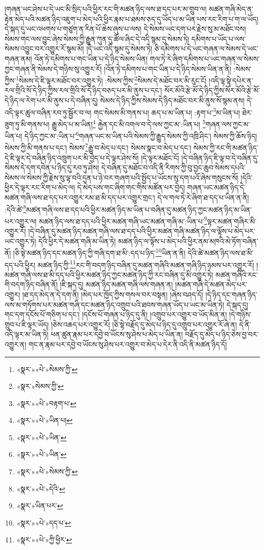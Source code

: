 །གཞན་ཡང་ཤེས་པ་དེ་ཡང་མི་སྲིད་པའི་ཕྱིར་རང་གི་མཚན་ཉིད་ལས་ཐ་དད་པར་མ་གྲུབ་ལ། མཚན་གཞི་མེད་ན་རྟེན་མེད་པའི་མཚན་ཉིད་འཇུག་པ་མེད་པའི་ཕྱིར་རྣམ་པ་ཐམས་ཅད་དུ་ཡོད་པ་མ་ཡིན་པས་རང་རིག་པ་ག་ལ་ཡོད། དེ་སྐད་དུ་ཡང་འཕགས་པ་གཙུག་ན་རིན་པོ་ཆེས་ཞུས་པ་ལས། དེ་སེམས་ཡང་དག་པར་རྗེས་སུ་མ་མཐོང་བས། སེམས་གང་ལས་བྱུང་ཞེས་སེམས་ཀྱི་རྒྱུན་ཀུན་དུ་ཚོལ་ཞིང་དེ་འདི་སྙམ་དུ་སེམས་ཏེ། དམིགས་པ་ཡོད་པ་ལས་སེམས་འབྱུང་བར་འགྱུར་རོ་སྙམ་མོ། །དེ་ཡང་འདི་སྙམ་དུ་སེམས་ཏེ། ཅི་དམིགས་པ་དེ་ཡང་གཞན་ལ་སེམས་དེ་ཡང་གཞན་ནམ། འོན་ཏེ་དམིགས་པ་གང་ཡིན་པ་དེ་ཉིད་སེམས་ཡིན། གལ་ཏེ་རེ་ཞིག་དམིགས་པ་ཡང་གཞན་ལ་སེམས་ཀྱང་གཞན་ནི་སེམས་དེ་གཉིས་སུ་འགྱུར་རོ། །འོན་ཏེ་དམིགས་པ་གང་ཡིན་པ་དེ་ཉིད་སེམས་ཡིན་ན་ནི། :སེམས་ཀྱིས་\footnote{«སྣར་»«པེ་»སེམས་ཀྱི་}སེམས་དེ་ཇི་ལྟར་མཐོང་བར་འགྱུར་ཏེ། :སེམས་ཀྱིས་\footnote{«སྣར་»སེམས་ཀྱི་}སེམས་དེ་མཐོང་བར་མི་རུང་ངོ། །འདི་ལྟ་སྟེ་དཔེར་ན་རལ་གྲིའི་སོ་དེ་ཉིད་ཀྱིས་རལ་གྲིའི་སོ་དེ་ཉིད་བཅད་པར་མི་ནུས་པ་དང་། སོར་མོའི་རྩེ་མོ་དེ་ཉིད་ཀྱིས་སོར་མོའི་རྩེ་མོ་དེ་ཉིད་ལ་རེག་པར་མི་ནུས་པ་དེ་བཞིན་དུ། སེམས་དེ་ཉིད་ཀྱིས་སེམས་དེ་ཉིད་མཐོང་བར་མི་ནུས་སོ་སྙམ་ནས། དེ་འདི་ལྟར་ཚུལ་བཞིན་རབ་ཏུ་སྦྱོར་བ་ལ། གང་སེམས་མི་གནས་པ། ཆད་པ་མ་ཡིན་པ། :རྟག་པ་\footnote{«སྣར་»«པེ་»བརྟག་པ་}མ་ཡིན་པ། ཐེར་ཟུག་ཏུ་མི་གནས་པ། རྒྱུ་མེད་པ་མ་ཡིན།\footnote{«སྣར་»«པེ་»ཡིན་པ།} རྐྱེན་དང་མི་འགལ་བ་དེ་ལས་ཀྱང་མ་:ཡིན་པ། \footnote{«སྣར་»«པེ་»ཡིན་}གཞན་ལས་ཀྱང་མ་ཡིན་པ། དེ་ཉིད་ཀྱང་མ་:ཡིན་པ་\footnote{«སྣར་»«པེ་»ཡིན་}གཞན་ཡང་མ་ཡིན་པའི་སེམས་ཀྱི་རྒྱུད་སེམས་ཀྱི་འཁྲི་ཤིང་། སེམས་ཀྱི་ཆོས་ཉིད། སེམས་ཀྱི་མི་གནས་པ་དང་། སེམས་\footnote{«སྣར་»«པེ་»སེམས་ཀྱི་}རྒྱུ་བ་མེད་པ་དང་། སེམས་སྣང་བ་མེད་པ་དང་། སེམས་ཀྱི་རང་གི་མཚན་ཉིད་དེ་ཇི་ལྟར་དེ་བཞིན་ཉིད་འཁྲུག་པར་མི་བྱེད་པ་དེ་ལྟར་ཤེས་སོ། །དེ་ལྟར་མཐོང་ངོ། །དེ་བཞིན་ཉིད་ཇི་ལྟ་བ་དེ་བཞིན་དུ་སེམས་དེ་དག་དབེན་པ་ཉིད་དུ་རབ་ཏུ་ཤེས། དེ་བཞིན་དུ་མཐོང་བ་འདི་ནི་རིགས་ཀྱི་བུ་བྱང་ཆུབ་སེམས་དཔའི་སེམས་ལ་སེམས་ཀྱི་རྗེས་སུ་ལྟ་བའི་དྲན་པ་ཉེ་བར་གཞག་པའི་སྤྱོད་པ་ཡོངས་སུ་དག་པའོ་ཞེས་གསུངས་སོ། །དེའི་ཕྱིར་དེ་ལྟར་རང་རིག་པ་མེད་ལ། དེ་མེད་པས་གང་ཞིག་གང་གིས་མཚོན་པར་བྱེད། གཞན་ཡང་མཚན་ཉིད་དེ་མཚན་གཞི་ལས་ཐ་དད་པར་འགྱུར་རམ་ཐ་མི་དད་པར་འགྱུར་གྲང་། དེ་ལ་གལ་ཏེ་རེ་ཞིག་ཐ་དད་པ་ཡིན་ན་ནི། :དེའི་ཚེ་\footnote{«སྣར་»«པེ་»དེའི་}མཚན་གཞི་ལས་ཐ་དད་པའི་ཕྱིར་མཚན་ཉིད་མ་ཡིན་པ་བཞིན་དུ་མཚན་ཉིད་ཀྱང་མཚན་ཉིད་མ་ཡིན་པར་འགྱུར་ལ། མཚན་ཉིད་ལས་ཐ་དད་པའི་ཕྱིར་མཚན་གཞི་ཡང་མཚན་གཞི་མ་:ཡིན་པ་\footnote{«སྣར་»ཡིན་པར་}ལྟར་མཚན་གཞིར་མི་འགྱུར་རོ། །དེ་བཞིན་དུ་མཚན་ཉིད་མཚན་གཞི་ལས་ཐ་དད་པའི་ཕྱིར་མཚན་གཞི་མཚན་ཉིད་ལ་ལྟོས་པ་མེད་པར་ཡང་འགྱུར་ཏེ། དེའི་ཕྱིར་དེ་མཚན་གཞི་མ་ཡིན་ཏེ། མཚན་ཉིད་ལ་ལྟོས་པ་མེད་པའི་ཕྱིར་ནམ་མཁའི་མེ་ཏོག་བཞིན་ནོ། །ཅི་སྟེ་མཚན་ཉིད་དང་མཚན་ཉིད་ཀྱི་གཞི་དག་ཐ་མི་:དད་པ་ཉིད་\footnote{«སྣར་»«པེ་»དད་པ་}ཡིན་ན་ནི། དེའི་ཚེ་མཚན་ཉིད་ལས་ཐ་མི་དད་པའི་ཕྱིར། མཚན་ཉིད་ཀྱི་\footnote{«སྣར་»«པེ་»ཀྱི་ཕྱིར་}རང་གི་བདག་ཉིད་བཞིན་དུ་མཚན་གཞིའི་མཚན་གཞི་ཉིད་ཉམས་པར་འགྱུར་རོ། །མཚན་གཞི་ལས་ཐ་མི་དད་པའི་ཕྱིར་མཚན་ཉིད་ཀྱང་མཚན་ཉིད་ཀྱི་རང་བཞིན་དུ་མི་འགྱུར་ཏེ། མཚན་གཞིའི་རང་གི་བདག་ཉིད་བཞིན་ནོ། །ཇི་སྐད་དུ། མཚན་ཉིད་མཚན་གཞི་ལས་གཞན་ན། །མཚན་གཞི་དེ་མཚན་མེད་པར་འགྱུར། །ཐ་དད་མེད་ན་དེ་དག་ནི། །མེད་པར་ཁྱོད་ཀྱིས་གསལ་བར་བསྟན། །ཞེས་བཤད་དོ། །དེ་ཉིད་དང་གཞན་ཉིད་ལས་མ་གཏོགས་པར་མཚན་གཞི་དང་མཚན་ཉིད་འགྲུབ་པའི་ཐབས་གཞན་ཡོད་པ་ཡང་མ་ཡིན་ཏེ། དེ་སྐད་དུ། གང་དག་དངོས་པོ་གཅིག་པ་དང་། །དངོས་པོ་གཞན་པ་ཉིད་དུ་ནི། །འགྲུབ་པར་འགྱུར་བ་ཡོད་མིན་ན། །དེ་གཉིས་གྲུབ་པ་ཇི་ལྟར་ཡོད། །ཅེས་འཆད་པར་འགྱུར་རོ། །ཅི་སྟེ་བརྗོད་དུ་མེད་པ་ཉིད་དུ་འགྲུབ་པར་འགྱུར་རོ་ཞེ་ན། དེ་ནི་འདི་ལྟར་མ་ཡིན་ཏེ། ཕན་ཚུན་རྣམ་པར་དབྱེ་བ་ཡོངས་སུ་ཤེས་པ་མེད་པ་ཡིན་ན། བརྗོད་དུ་མེད་པ་ཉིད་ཅེས་བྱ་བར་འགྱུར་ན། གང་ན་རྣམ་པར་དབྱེ་བ་ཡོངས་སུ་ཤེས་པར་འགྱུར་བ་མེད་པ་དེར་ནི་འདི་ནི་མཚན་ཉིད་དོ། 